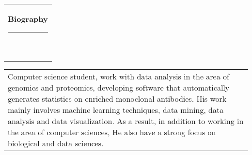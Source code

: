 \documentclass[10pt,A4,english]{article}
\newcommand*{\vcenteredhbox}[1]{\begingroup
\setbox0=\hbox{#1}\parbox{\wd0}{\box0}\endgroup}
\newcommand{\icon}[3] { 							
	\makebox(#2, #2){\textcolor{maincol}{\csname fa#1\endcsname}}
}
\newcommand{\icontext}[4]{ 						
	\vcenteredhbox{\icon{#1}{#2}{#3}}  \hspace{2pt}  \parbox{0.9\mpwidth}{\textcolor{#4}{#3}}
}
\newcommand{\mpwidth}{\linewidth-\fboxsep-\fboxsep}
\newcommand{\cvtext}[1] {
	\begin{tabular*}{1\mpwidth}{p{0.98\mpwidth}}
		\parbox{1\mpwidth}{#1}
	\end{tabular*}
}
\newcommand{\cvsection}[1] {
	\vspace{8pt}
	\cvtext{
		\textbf{\LARGE{\textcolor{darkcol}{#1}}}\\[-4pt]
		\textcolor{accentcol}{ \rule{0.2\textwidth}{1.5pt} } \\
	}
}
\newcommand{\cvmetaevent}[4] {
	\textcolor{maincol} { \cvtext{\textbf{\begin{flushleft}#1\end{flushleft}}}}

	\ifthenelse{\isempty{#2}}{}{
	\textcolor{black} {\cvtext{\textbf{#2}} }
	}

	\ifthenelse{\isempty{#3}}{}{
		\cvtext{{ \textcolor{maincol} {#3} }}\\
	}

	\cvtext{#4}\\[14pt]
}
\newcommand{\cvqrcode}[1] {
	\begin{center}
		\texttt{[image: qrcode]}
	\end{center}
}
\begin{document}
\begin{paracol}{2}
\begin{leftcolumn}












\end{leftcolumn}
\begin{rightcolumn}


\cvsection{Biography}
\vspace{4pt}

\cvtext{

  Computer science student, work with data analysis in the area of genomics and
  proteomics, developing software that automatically generates statistics on
  enriched monoclonal antibodies. His work mainly involves machine learning
  techniques, data mining, data analysis and data visualization. As a result, in
  addition to working in the area of computer sciences, He also have a strong
  focus on biological and data sciences.\\[-8pt]

}
\end{rightcolumn}
\end{paracol}
\end{document}
